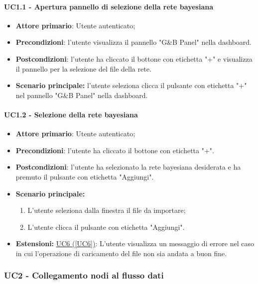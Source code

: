 \paragraph{UC1.1 - Apertura pannello di selezione della rete bayesiana}\label{UC1.1}
\begin{itemize}
	\item \textbf{Attore primario}: Utente autenticato; 
	\item \textbf{Precondizioni}: l'utente visualizza il pannello "G\&B Panel" nella dashboard.
	\item \textbf{Postcondizioni}: l'utente ha cliccato il bottone con etichetta "+" e visualizza il pannello per la selezione del file della rete.
	\item \textbf{Scenario principale:} l'utente seleziona clicca il pulsante con etichetta "+" nel pannello "G\&B Panel" nella dashboard.
\end{itemize}


\paragraph{UC1.2 - Selezione della rete bayesiana}\label{UC1.2}
\begin{itemize}
	\item \textbf{Attore primario}: Utente autenticato;
	\item \textbf{Precondizioni}: l'utente ha cliccato il bottone con etichetta "+".
	\item \textbf{Postcondizioni}: l'utente ha selezionato la rete bayesiana desiderata e ha premuto il pulsante con etichetta "Aggiungi".
	\item \textbf{Scenario principale:}
	\begin{enumerate}
		\item L'utente seleziona dalla finestra il file da importare;
		\item L'utente clicca il pulsante con etichetta "Aggiungi".
	\end{enumerate}
	\item \textbf{Estensioni:} \hyperref[UC6]{UC6 (\ref*{UC6})}: L'utente visualizza un messaggio di errore nel caso in cui l'operazione di caricamento del file non sia andata a buon fine.
\end{itemize}

\pagebreak

\subsubsection{UC2 - Collegamento nodi al flusso dati}\label{UC2}

